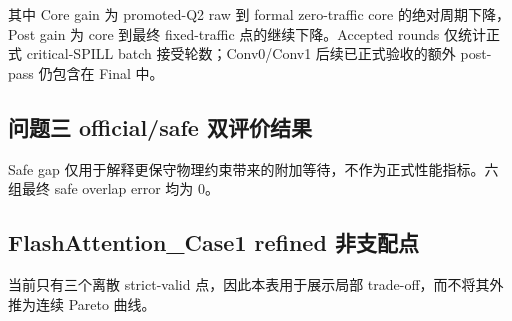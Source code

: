 其中 Core gain 为 promoted-Q2 raw 到 formal zero-traffic core 的绝对周期下降，Post gain 为 core 到最终 fixed-traffic 点的继续下降。Accepted rounds 仅统计正式 critical-SPILL batch 接受轮数；Conv0/Conv1 后续已正式验收的额外 post-pass 仍包含在 Final 中。

\subsection{问题三 official/safe 双评价结果}

\begin{table}[H]
    \centering
    \caption{问题三最终 official 与 residency-safe 周期}
    \label{tab:app-q3-dual}
    \resizebox{0.94\textwidth}{!}{}
\end{table}

Safe gap 仅用于解释更保守物理约束带来的附加等待，不作为正式性能指标。六组最终 safe overlap error 均为 0。

\subsection{FlashAttention\_Case1 refined 非支配点}

\begin{table}[H]
    \centering
    \caption{FA1 strict-valid Traffic--Cycles 非支配点}
    \label{tab:app-fa1-frontier}
    \resizebox{0.86\textwidth}{!}{}
\end{table}

当前只有三个离散 strict-valid 点，因此本表用于展示局部 trade-off，而不将其外推为连续 Pareto 曲线。

